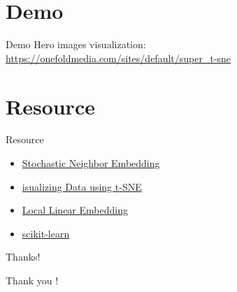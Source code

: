 \documentclass[10pt]{beamer}
\begin{document}
\section{Demo}
\begin{frame}{Demo}
Hero images visualization: \url{https://onefoldmedia.com/sites/default/super_t-sne}
\end{frame}

\section{Resource}
\begin{frame}{Resource}
\begin{itemize}
	\item \href{http://www.cs.toronto.edu/~hinton/absps/sne.pdf}{Stochastic Neighbor Embedding}
	\item \href{http://www.cs.toronto.edu/~hinton/absps/tsnefinal.pdf}{isualizing Data using t-SNE}
	\item \href{http://www.cs.toronto.edu/~hinton/csc2535/readings/lle.pdf}{Local Linear Embedding}
	\item \href{http://scikit-learn.org/stable/index.html}{scikit-learn}
\end{itemize}
\end{frame}

\begin{frame}{Thanks!}
\begin{center}
	\LARGE Thank you !
\end{center}
\end{frame}
\end{document}
